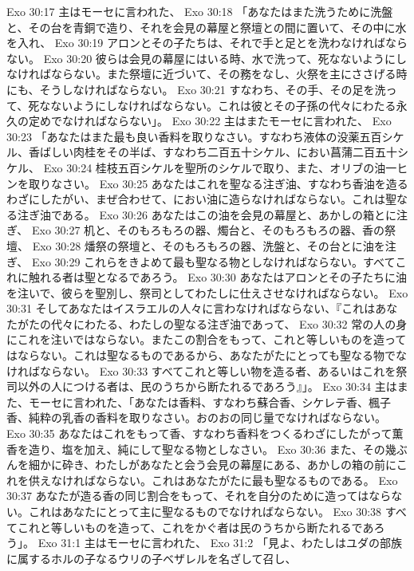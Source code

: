 Exo 30:17  主はモーセに言われた、
Exo 30:18  「あなたはまた洗うために洗盤と、その台を青銅で造り、それを会見の幕屋と祭壇との間に置いて、その中に水を入れ、
Exo 30:19  アロンとその子たちは、それで手と足とを洗わなければならない。
Exo 30:20  彼らは会見の幕屋にはいる時、水で洗って、死なないようにしなければならない。また祭壇に近づいて、その務をなし、火祭を主にささげる時にも、そうしなければならない。
Exo 30:21  すなわち、その手、その足を洗って、死なないようにしなければならない。これは彼とその子孫の代々にわたる永久の定めでなければならない」。
Exo 30:22  主はまたモーセに言われた、
Exo 30:23  「あなたはまた最も良い香料を取りなさい。すなわち液体の没薬五百シケル、香ばしい肉桂をその半ば、すなわち二百五十シケル、におい菖蒲二百五十シケル、
Exo 30:24  桂枝五百シケルを聖所のシケルで取り、また、オリブの油一ヒンを取りなさい。
Exo 30:25  あなたはこれを聖なる注ぎ油、すなわち香油を造るわざにしたがい、まぜ合わせて、におい油に造らなければならない。これは聖なる注ぎ油である。
Exo 30:26  あなたはこの油を会見の幕屋と、あかしの箱とに注ぎ、
Exo 30:27  机と、そのもろもろの器、燭台と、そのもろもろの器、香の祭壇、
Exo 30:28  燔祭の祭壇と、そのもろもろの器、洗盤と、その台とに油を注ぎ、
Exo 30:29  これらをきよめて最も聖なる物としなければならない。すべてこれに触れる者は聖となるであろう。
Exo 30:30  あなたはアロンとその子たちに油を注いで、彼らを聖別し、祭司としてわたしに仕えさせなければならない。
Exo 30:31  そしてあなたはイスラエルの人々に言わなければならない、『これはあなたがたの代々にわたる、わたしの聖なる注ぎ油であって、
Exo 30:32  常の人の身にこれを注いではならない。またこの割合をもって、これと等しいものを造ってはならない。これは聖なるものであるから、あなたがたにとっても聖なる物でなければならない。
Exo 30:33  すべてこれと等しい物を造る者、あるいはこれを祭司以外の人につける者は、民のうちから断たれるであろう』」。
Exo 30:34  主はまた、モーセに言われた、「あなたは香料、すなわち蘇合香、シケレテ香、楓子香、純粋の乳香の香料を取りなさい。おのおの同じ量でなければならない。
Exo 30:35  あなたはこれをもって香、すなわち香料をつくるわざにしたがって薫香を造り、塩を加え、純にして聖なる物としなさい。
Exo 30:36  また、その幾ぶんを細かに砕き、わたしがあなたと会う会見の幕屋にある、あかしの箱の前にこれを供えなければならない。これはあなたがたに最も聖なるものである。
Exo 30:37  あなたが造る香の同じ割合をもって、それを自分のために造ってはならない。これはあなたにとって主に聖なるものでなければならない。
Exo 30:38  すべてこれと等しいものを造って、これをかぐ者は民のうちから断たれるであろう」。
Exo 31:1  主はモーセに言われた、
Exo 31:2  「見よ、わたしはユダの部族に属するホルの子なるウリの子ベザレルを名ざして召し、
